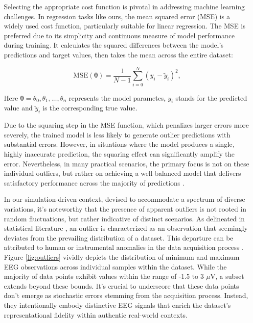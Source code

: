 \documentclass[a4paper, UKenglish, 11pt]{uiomaster}
\begin{document}
Selecting the appropriate cost function is pivotal in addressing machine learning challenges. In regression tasks like ours, the mean squared error (MSE) is a widely used cost function, particularly suitable for linear regression. The MSE is preferred due to its simplicity and continuous measure of model performance during training. It calculates the squared differences between the model's predictions and target values, then takes the mean across the entire dataset:

\begin{equation}
\text{MSE}(\boldsymbol{\theta}) = \frac{1}{N-1}
\sum_{i=0}^{N}(y_i-\tilde{y}_i)^2 ,
\label{eq:MSE}
\end{equation}

Here $\boldsymbol{\theta} = \theta_0, \theta_1, ..., \theta_n$ represents the model parametes, $y_i$ stands for the predicted value and $\tilde{y}_i$ is the corresponding true value.

Due to the squaring step in the MSE function, which penalizes larger errors more severely, the trained model is less likely to generate outlier predictions with substantial errors. However, in situations where the model produces a single, highly inaccurate prediction, the squaring effect can significantly amplify the error. Nevertheless, in many practical scenarios, the primary focus is not on these individual outliers, but rather on achieving a well-balanced model that delivers satisfactory performance across the majority of predictions \cite{builtin-ml-loss-functions}.


In our simulation-driven context, devised to accommodate a spectrum of diverse variations, it's noteworthy that the presence of apparent outliers is not rooted in random fluctuations, but rather indicative of distinct scenarios. As delineated in statistical literature \cite{barnett1994outliers}, an outlier is characterized as an observation that seemingly deviates from the prevailing distribution of a dataset. This departure can be attributed to human or instrumental anomalies in the data acquisition process \cite{zhang2015outlier}. Figure \ref{fig:outliers} vividly depicts the distribution of minimum and maximum EEG observations across individual samples within the dataset. While the majority of data points exhibit values within the range of -1.5 to 3 $\mu$V, a subset extends beyond these bounds. It's crucial to underscore that these data points don't emerge as stochastic errors stemming from the acquisition process. Instead, they intentionally embody distinctive EEG signals that enrich the dataset's representational fidelity within authentic real-world contexts.
\end{document}
